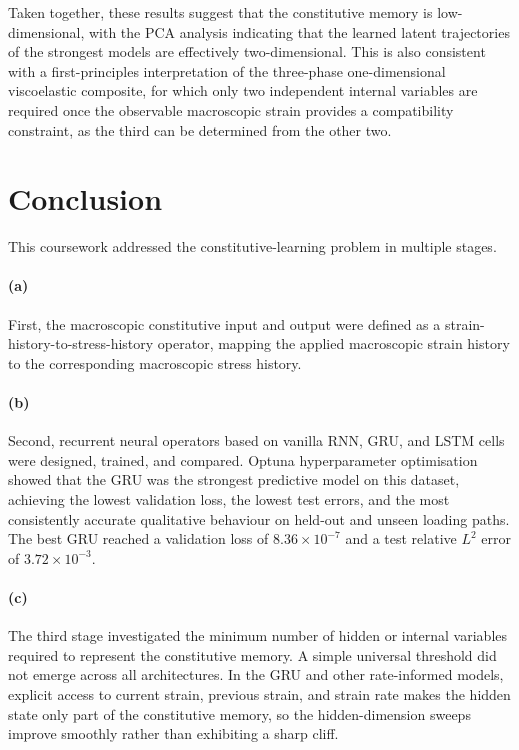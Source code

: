 \documentclass[11pt,a4paper, onecolumn]{article}
\begin{document}
Taken together, these results suggest that the constitutive memory is low-dimensional, with the PCA analysis indicating that the learned latent trajectories of the strongest models are effectively two-dimensional. This is also consistent with a first-principles interpretation of the three-phase one-dimensional viscoelastic composite, for which only two independent internal variables are required once the observable macroscopic strain provides a compatibility constraint, as the third can be determined from the other two.



\FloatBarrier
\section{Conclusion}

This coursework addressed the constitutive-learning problem in multiple stages. 

\paragraph{(a)}First, the macroscopic constitutive input and output were defined as a strain-history-to-stress-history operator, mapping the applied macroscopic strain history to the corresponding macroscopic stress history. 

\paragraph{(b)}Second, recurrent neural operators based on vanilla RNN, GRU, and LSTM cells were designed, trained, and compared. Optuna hyperparameter optimisation showed that the GRU was the strongest predictive model on this dataset, achieving the lowest validation loss, the lowest test errors, and the most consistently accurate qualitative behaviour on held-out and unseen loading paths. The best GRU reached a validation loss of $8.36\times10^{-7}$ and a test relative $L^2$ error of $3.72\times10^{-3}$.

\paragraph{(c)}The third stage investigated the minimum number of hidden or internal variables required to represent the constitutive memory. A simple universal threshold did not emerge across all architectures. In the GRU and other rate-informed models, explicit access to current strain, previous strain, and strain rate makes the hidden state only part of the constitutive memory, so the hidden-dimension sweeps improve smoothly rather than exhibiting a sharp cliff. 
\end{document}
